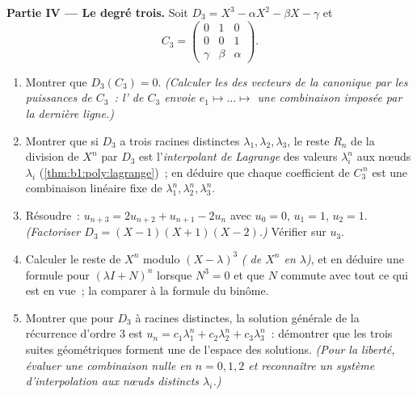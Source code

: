 \begin{problem}
\medskip
\noindent\textbf{Partie IV --- Le degré trois.} Soit $D_3 = X^3 -
\alpha X^2 - \beta X - \gamma$ et
\[
C_3 = \begin{pmatrix} 0 & 1 & 0\\ 0 & 0 & 1\\ \gamma & \beta &
\alpha \end{pmatrix}.
\]
\begin{enumerate}[resume]
  \item Montrer que $D_3(C_3) = 0$. \emph{(Calculer les  des
        vecteurs de la  canonique par les puissances de $C_3$~:
        l' de $C_3$ envoie $e_1 \mapsto \dots \mapsto$ une
        combinaison imposée par la dernière ligne.)}
  \item Montrer que si $D_3$ a trois racines distinctes $\lambda_1,
        \lambda_2, \lambda_3$, le reste $R_n$ de la division de $X^n$
        par $D_3$ est l'\emph{interpolant de Lagrange} des valeurs
        $\lambda_i^n$ aux nœuds $\lambda_i$
        (\cref{thm:b1:poly:lagrange})~; en déduire que chaque
        coefficient de $C_3^{\,n}$ est une combinaison linéaire fixe de
        $\lambda_1^n, \lambda_2^n, \lambda_3^n$.
  \item Résoudre~: $u_{n+3} = 2u_{n+2} + u_{n+1} - 2u_n$ avec $u_0 =
        0$, $u_1 = 1$, $u_2 = 1$. \emph{(Factoriser $D_3 = (X - 1)(X
        + 1)(X - 2)$.)} Vérifier sur $u_3$.
  \item Calculer le reste de $X^n$ modulo $(X -
        \lambda)^3$ \emph{( de $X^n$ en
        $\lambda$)}, et en déduire une formule pour $(\lambda I +
        N)^n$ lorsque $N^3 = 0$ et que $N$ commute avec tout ce qui
        est en vue~; la comparer à la formule du binôme.
  \item Montrer que pour $D_3$ à racines distinctes, la solution
        générale de la récurrence d'ordre $3$ est $u_n = c_1
        \lambda_1^n + c_2\lambda_2^n + c_3\lambda_3^n$~: démontrer
        que les trois suites géométriques forment une  de
        l'espace des solutions. \emph{(Pour la liberté, évaluer une
        combinaison nulle en $n = 0, 1, 2$ et reconnaître un système
        d'interpolation aux nœuds distincts
        $\lambda_i$.)}
\end{enumerate}


\end{problem}
